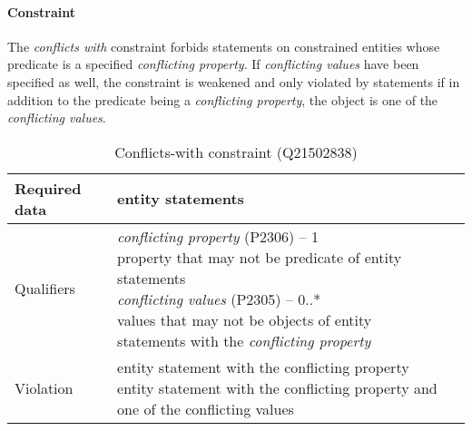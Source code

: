 \documentclass[hyperref,bachelorofscience,fleqn]{cgvpub}
\begin{document}
\paragraph{Constraint}
The \emph{conflicts with} constraint forbids statements on constrained entities whose predicate is a specified \emph{conflicting property}. If \emph{conflicting values} have been specified as well, the constraint is weakened and only violated by statements if in addition to the predicate being a \emph{conflicting property}, the object is one of the \emph{conflicting values}.
\begin{table}[H]
\caption{Conflicts-with constraint (Q21502838)}
\begin{tabularx}{\textwidth}{ ll X}
\hline
Required data & entity statements \\
\hline
Qualifiers & \makecell{\emph{conflicting property} (P2306) -- 1 \\ property that may not be predicate of entity statements \\
\emph{conflicting values} (P2305) -- 0..* \\ values that may not be objects of entity statements with the \emph{conflicting property}} \\
\hline
Violation & \makecell{entity statement with the conflicting property \\ entity statement with the conflicting property and one of the conflicting values} \\
\hline
\end{tabularx}
\end{table}
\end{document}
